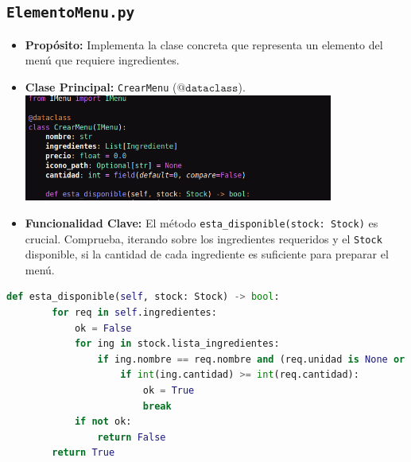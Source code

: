 \documentclass[a4paper, 12pt]{article}
\begin{document}
\subsection{\texttt{ElementoMenu.py}}
\begin{itemize}
    \item \textbf{Propósito:} Implementa la clase concreta que representa un elemento del menú que requiere ingredientes.
    \item \textbf{Clase Principal:} \texttt{CrearMenu} ($\texttt{@dataclass}$).  \\
\includegraphics[width=0.8\textwidth]{images/4.png}
    \item \textbf{Funcionalidad Clave:} El método \texttt{esta\_disponible(stock: Stock)} es crucial. Comprueba, iterando sobre los ingredientes requeridos y el \texttt{Stock} disponible, si la cantidad de cada ingrediente es suficiente para preparar el menú.
\end{itemize}
\begin{lstlisting}[language=Python, caption=Función de esta disponible]
    def esta_disponible(self, stock: Stock) -> bool:
        for req in self.ingredientes:
            ok = False
            for ing in stock.lista_ingredientes:
                if ing.nombre == req.nombre and (req.unidad is None or ing.unidad == req.unidad):
                    if int(ing.cantidad) >= int(req.cantidad):
                        ok = True
                        break
            if not ok:
                return False
        return True
\end{lstlisting}

\newpage
\end{document}
